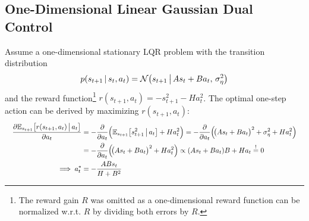 		\subsection{One-Dimensional Linear Gaussian Dual Control}
			Assume a one-dimensional stationary LQR problem with the transition distribution
			\begin{equation*}
				p(s_{t + 1} \,\vert\, s_t, a_t) = \mathcal{N}\big( s_{t + 1} \,\big\vert\, A s_t + B a_t,\, \sigma_\eta^2 \big)
			\end{equation*}
			and the reward function\footnote{The reward gain \(R\) was omitted as a one-dimensional reward function can be normalized w.r.t. \(R\) by dividing both errors by \(R\).} \( r(s_{t + 1}, a_t) = -s_{t + 1}^2 - H a_t^2 \). The optimal one-step action can be derived by maximizing \( r(s_{t + 1}, a_t) \):
			\begin{align*}
				                                                                                 &                                                                                        & \pdv{\mathbb{E}_{s_{t + 1}}\big[ r(s_{t + 1}, a_t) \,\big\vert\,a_t \big]}{a_t}
				                                                                                 & = -\pdv{a_t} \Big( \mathbb{E}_{s_{t + 1}}\big[ s_{t + 1}^2 \,\big\vert\, a_t \big] + H a_t^2 \Big)
				= -\pdv{a_t} \Big(\! \big( A s_t + B a_t \big)^2 + \sigma_\eta^2 + H a_t^2 \Big) &                                                                                                                                                                                                                                    \\
				                                                                                 &                                                                                        &                                                                      & = -\pdv{a_t} \Big(\! \big( A s_t + B a_t \big)^2 + H a_t^2 \Big)
				\propto (A s_t + B a_t) B + H a_t \overset{!}{=} 0                               &                                                                                                                                                                                                                                    \\
				                                                                                 &                                                                                        & \implies a_t^\ast                                                    & = -\frac{A B s_t}{H + B^2}                                       &
			\end{align*}
